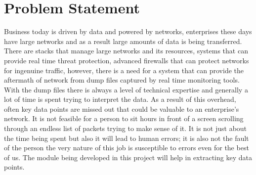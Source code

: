 \chapter{Problem Statement}
\fontsize{12}{0}
{
	Business today is driven by data and powered by networks, enterprises these days have large networks and as a result large amounts of data is being transferred. There are stacks that manage large networks and its resources, systems that can provide real time threat protection, advanced firewalls that can protect networks for ingenuine traffic, however, there is a need for a system that can provide the aftermath of network from dump files captured by real time monitoring tools.
	With the dump files there is always a level of technical expertise and generally a lot of time is spent trying to interpret the data. As a result of this overhead, often key data points are missed out that could be valuable to an enterprise’s network. It is not feasible for a person to sit hours in front of a screen scrolling through an endless list of packets trying to make sense of it. It is not just about the time being spent but also it will lead to human errors; it is also not the fault of the person the very nature of this job is susceptible to errors even for the best of us. The module being developed in this project will help in extracting key data points.
}